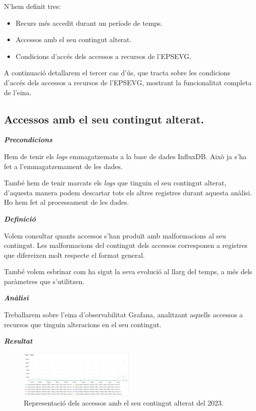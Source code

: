 \documentclass[lettersize,journal]{IEEEtran}
\begin{document}
N'hem definit tres:
\begin{itemize}
    \item Recurs més accedit durant un període de temps.
    \item Accessos amb el seu contingut alterat.
    \item Condicions d'accés dels accessos a recursos de l'EPSEVG.
\end{itemize}

A continuació detallarem el tercer cas d'ús, que tracta sobre les condicions d'accés dels accessos a recursos de l'EPSEVG, mostrant la funcionalitat completa de l'eina.

\subsection{Accessos amb el seu contingut alterat.}\label{subsec:use-case-2}

\textit{\textbf{Precondicions}}

Hem de tenir els \textit{logs} emmagatzemats a la base de dades InfluxDB.
Això ja s'ha fet a l'emmagatzemament de les dades.

També hem de tenir marcats els \textit{logs} que tinguin el seu contingut alterat, d'aquesta manera podem descartar tots els altres registres durant aquesta anàlisi.
Ho hem fet al processament de les dades.

\textit{\textbf{Definició}}

Volem consultar quants accessos s'han produït amb malformacions al seu contingut.
Les malformacions del contingut dels accessos corresponen a registres que difereixen molt respecte el format general.

També volem esbrinar com ha sigut la seva evolució al llarg del temps, a més dels paràmetres que s'utilitzen.

\textit{\textbf{Anàlisi}}

Treballarem sobre l'eina d'observabilitat Grafana, analitzant aquells accessos a recursos que tinguin alteracions en el seu contingut.

\textit{\textbf{Resultat}}

\begin{figure}[!t]
    \centerline{\includegraphics[width=0.5\textwidth]{figures/possible-attacks}}
    \caption{Representació dels accessos amb el seu contingut alterat del 2023.}\label{fig:log-altered}
\end{figure}
\end{document}
